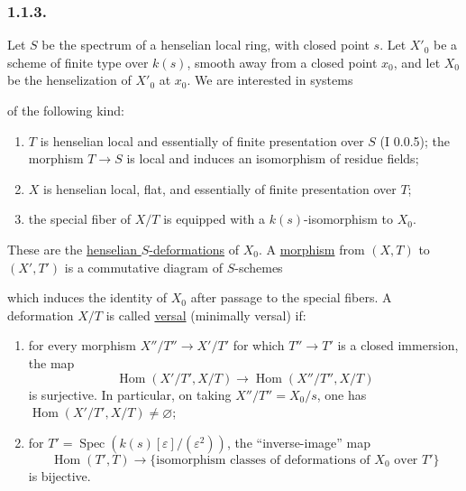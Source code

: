 \subsubsection*{1.1.3.}
Let $S$ be the spectrum of a henselian local ring, with closed point
$s$.  Let $X'_0$ be a scheme of finite type over $k(s)$, smooth away
from a closed point $x_0$, and let $X_0$ be the henselization of
$X'_0$ at $x_0$.  We are interested in systems
\begin{center}
\end{center}
of the following kind:
\begin{enumerate}[label=(\alph*),leftmargin=2.6em]
\item $T$ is henselian local and essentially of finite presentation
over $S$ (I 0.0.5); the morphism $T\to S$ is local and induces an
isomorphism of residue fields;

\item $X$ is henselian local, flat, and essentially of finite
presentation over $T$;

\item the special fiber of $X/T$ is equipped with a
$k(s)$-isomorphism to $X_0$.
\end{enumerate}
These are the \underline{henselian $S$-deformations} of $X_0$.
A \underline{morphism} from $(X,T)$ to $(X',T')$ is a commutative
diagram of $S$-schemes
\begin{center}
\end{center}
which induces the identity of $X_0$ after passage to the special
fibers.  A deformation $X/T$ is called \underline{versal}
(minimally versal) if:
\begin{enumerate}[label=(\alph*),leftmargin=2.6em]
\item for every morphism $X''/T''\longrightarrow X'/T'$ for which
$T''\to T'$ is a closed immersion, the map
\[
\operatorname{Hom}(X'/T',X/T)
\longrightarrow\operatorname{Hom}(X''/T'',X/T)
\]
is surjective.  In particular, on taking $X''/T''=X_0/s$, one has
$\operatorname{Hom}(X'/T',X/T)\ne\varnothing$;

\item for
$T'=\operatorname{Spec}(k(s)[\varepsilon]/(\varepsilon^2))$, the
``inverse-image'' map
\[
\operatorname{Hom}(T',T)\longrightarrow
\{\text{isomorphism classes of deformations of $X_0$ over $T'$}\}
\]
is bijective.
\end{enumerate}

